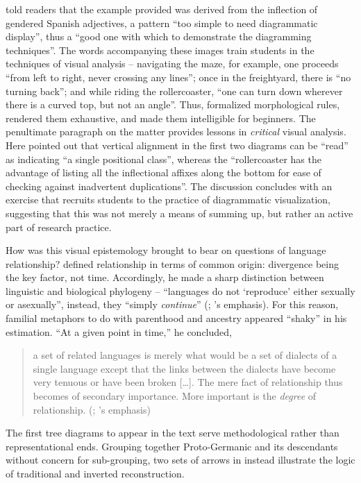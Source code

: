 \documentclass[output=paper]{langscibook}
\begin{document}
{\Hockett} told readers that the example provided was derived from the inflection of gendered Spanish adjectives, a pattern ``too simple to need diagrammatic display'', thus a ``good one with which to demonstrate the diagramming techniques''. The words accompanying these images train students in the techniques of visual analysis -- navigating the maze, for example, one proceeds ``from left to right, never crossing any lines''; once in the freightyard, there is ``no turning back''; and while riding the rollercoaster, ``one can turn down wherever there is a curved top, but not an angle''. Thus, {\Hockett} formalized morphological rules, rendered them exhaustive, and made them intelligible for beginners. The penultimate paragraph on the matter provides lessons in \emph{critical} visual analysis. Here {\Hockett} pointed out that vertical alignment in the first two diagrams can be ``read'' as indicating ``a single positional class'', whereas the ``rollercoaster has the advantage of listing all the inflectional affixes along the bottom for ease of checking against inadvertent duplications''. The discussion concludes with an exercise that recruits students to the practice of diagrammatic visualization, suggesting that this was not merely a means of summing up, but rather an active part of research practice.

How was this visual epistemology brought to bear on questions of language relationship? {\Hockett} defined relationship in terms of common origin: divergence being the key factor, not time. Accordingly, he made a sharp distinction between linguistic and biological phylogeny -- ``languages do not `reproduce' either sexually or asexually'', instead, they ``simply \emph{continue}'' (\citealt[369]{Hockett19591958}; {\Hockett}'s emphasis). For this reason, familial metaphors to do with parenthood and ancestry appeared ``shaky'' in his estimation. ``At a given point in time,'' he concluded,

\begin{quotation}
a set of related languages is merely what would be a set of dialects of a single language except that the links between the dialects have become very tenuous or have been broken […]. The mere fact of relationship thus becomes of secondary importance. More important is the \emph{degree} of relationship. (\citealt[369]{Hockett19591958}; {\Hockett}'s emphasis)
\end{quotation}

The first tree diagrams to appear in the text serve methodological rather than representational ends. Grouping together Proto-Germanic and its descendants without concern for sub-grouping, two sets of arrows in  instead illustrate the logic of traditional and inverted reconstruction.
\end{document}
